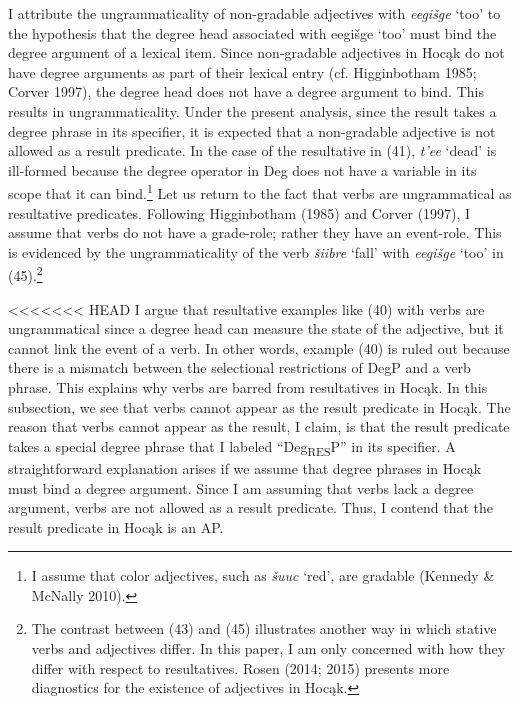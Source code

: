 \documentclass[output=paper]{LSP/langsci}
\begin{document}
\begin{exe}
\begin{exe}
\begin{exe}
\begin{exe}
{\begin{exe}
I attribute the ungrammaticality of non-gradable adjectives with \textit{eegi\v{s}ge} `too' to the hypothesis that the degree head associated with eegi\v{s}ge `too' must bind the degree argument of a lexical item. Since non-gradable adjectives in Hoc\k{a}k do not have degree arguments as part of their lexical entry (cf. Higginbotham 1985; Corver 1997), the degree head does not have a degree argument to bind. This results in ungrammaticality. Under the present analysis, since the result takes a degree phrase in its specifier, it is expected that a non-gradable adjective is not allowed as a result predicate. In the case of the resultative in (41), \textit{t'ee} `dead' is ill-formed because the degree operator in Deg does not have a variable in its scope that it can bind.\footnote{I assume that color adjectives, such as \textit{\v{s}uuc} `red', are gradable (Kennedy \& McNally 2010).} Let us return to the fact that verbs are ungrammatical as resultative predicates. Following Higginbotham (1985) and Corver (1997), I assume that verbs do not have a grade-role; rather they have an event-role. This is evidenced by the ungrammaticality of the verb \textit{\v{s}iibre} `fall' with \textit{eegi\v{s}ge} `too' in (45).\footnote{The contrast between (43) and (45) illustrates another way in which stative verbs and adjectives differ. In this paper, I am only concerned with how they differ with respect to resultatives. Rosen (2014; 2015) presents more diagnostics for the existence of adjectives in Hoc\k{a}k.}

\begin{exe}


\end{exe}

<<<<<<< HEAD
I argue that resultative examples like (40) with verbs are ungrammatical since a degree head can measure the state of the adjective, but it cannot link the event of a verb. In other words, example (40) is ruled out because there is a mismatch between the selectional restrictions of DegP and a verb phrase. This explains why verbs are barred from resultatives in Hocąk. In this subsection, we see that verbs cannot appear as the result predicate in Hocąk. The reason that verbs cannot appear as the result, I claim, is that the result predicate takes a special degree phrase that I labeled ``Deg\textsubscript{RES}P'' in its specifier. A straightforward explanation arises if we assume that degree phrases in Hocąk must bind a degree argument. Since I am assuming that verbs lack a degree argument, verbs are not allowed as a result predicate. Thus, I contend that the result predicate in Hocąk is an AP.


\end{exe}}
\end{exe}
\end{exe}
\end{exe}
\end{exe}
\end{document}
